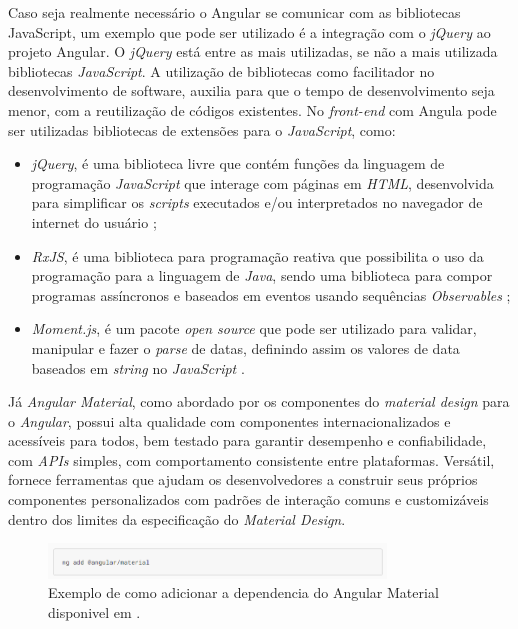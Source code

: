 	Caso seja realmente necessário o Angular se comunicar com as bibliotecas JavaScript, um exemplo que pode ser utilizado é a integração com o \textit{jQuery} ao projeto Angular. O \textit{jQuery} está entre as mais utilizadas, se não a mais utilizada bibliotecas \textit{JavaScript}. A utilização de bibliotecas como facilitador no desenvolvimento de software, auxilia para que o tempo de desenvolvimento seja menor, com a reutilização de códigos existentes. No \textit{front-end} com Angula pode ser utilizadas bibliotecas de extensões para o \textit{JavaScript}, como:
    
\begin{itemize}

    \item \textit{jQuery}, é uma biblioteca livre que contém funções da linguagem de programação \textit{JavaScript} que interage com páginas em \textit{HTML}, desenvolvida para simplificar os \textit{scripts} executados e/ou interpretados no navegador de internet do usuário \cite{plinio};
    
    \item \textit{RxJS}, é uma biblioteca para programação reativa que possibilita o uso da programação para a linguagem de \textit{Java}, sendo uma biblioteca para compor programas assíncronos e baseados em eventos usando sequências \textit{Observables} \cite{rxjs};
    
    \item \textit{Moment.js}, é um pacote \textit{open source} que pode ser utilizado para validar, manipular e fazer o \textit{parse} de datas, definindo assim os valores de data baseados em \textit{string} no  \textit{JavaScript} \cite{moment}.

\end{itemize}

    Já \textit{Angular Material}, como abordado por  os componentes do \textit{material design} para o \textit{Angular}, possui alta qualidade com componentes internacionalizados e acessíveis para todos, bem testado para garantir desempenho e confiabilidade, com \textit{APIs} simples, com comportamento consistente entre plataformas. Versátil, fornece ferramentas que ajudam os desenvolvedores a construir seus próprios componentes personalizados com padrões de interação comuns e customizáveis dentro dos limites da especificação do \textit{Material Design}.
    
        \begin{figure}[h]
        \centering
        \includegraphics[width=0.80\textwidth]{./img/MaterialDesign.png}
        \caption{Exemplo de como adicionar a dependencia do Angular Material disponivel em \cite{material}.}
        \label{fig:MaterialDesign}
        \end{figure}

